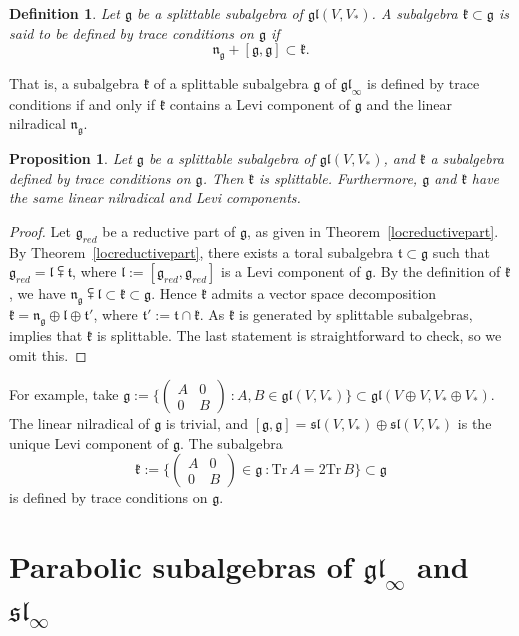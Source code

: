 \documentclass{article}
\newcommand {\tr} {\mathrm{Tr}}
\def\gl{\mathfrak {gl}}
\def\g{\mathfrak {g}}
\def\l{\mathfrak {l}}
\def\n{\mathfrak {n}}
\def\sl{\mathfrak{sl}}
\def\t{\mathfrak{t}}
\def\k{\mathfrak{k}}
\newtheorem{prop}[thm]{Proposition}
\newtheorem{defn}[thm]{Definition}
\begin{document}
\begin{defn} \label{traceconditions}
Let $\g$ be a splittable subalgebra of  $\gl(V,V_*)$.  A subalgebra $\k \subset \g$ is said to be \emph{defined by trace conditions} on $\g$ if $$\n_\g + [\g,\g] \subset \k.$$
\end{defn}


That is, a subalgebra $\k$ of a splittable subalgebra $\g$ of $\gl_\infty$ is defined by trace conditions if and only if $\k$ contains a Levi component of $\g$ and the linear nilradical $\n_\g$.  


\begin{prop} \label{toraltrace}
Let $\g$ be a splittable subalgebra of  $\gl(V,V_*)$, and $\k$ a subalgebra defined by trace conditions on $\g$.  Then $\k$ is splittable.  Furthermore, $\g$ and $\k$ have the same linear nilradical and Levi components.
\end{prop}

\begin{proof}
Let $\g_{red}$ be a reductive part of $\g$, as given in Theorem~\ref{locreductivepart}.   By Theorem~\ref{locreductivepart}, there exists a toral subalgebra $\t \subset \g$ such that $\g_{red} = \l \subsetplus \t$, where $\l := [\g_{red},\g_{red}]$ is a Levi component of $\g$.  By the definition of $\k$, we have $\n_\g \subsetplus \l \subset \k \subset \g$.  Hence $\k$ admits a vector space decomposition $\k = \n_\g \oplus \l \oplus \t'$, where $\t' := \t \cap \k$.  As $\k$ is generated by splittable subalgebras, \cite[Ch 7 \S 5 Cor 1]{Bourbaki} implies that $\k$ is splittable.
The last statement is straightforward to check, so we omit this.
\end{proof}


For example, take $\g :=  \Big\{ \left( \begin{array}{cc} A & 0 \\ 0 & B \end{array} \right) ~\colon  A, B \in \gl(V,V_*)  \Big\} \subset \gl(V \oplus V, V_* \oplus V_*)$. The linear nilradical of $\g$ is trivial, and $[\g,\g] = \sl(V,V_*) \oplus \sl(V,V_*)$ is the unique Levi component of $\g$.  The subalgebra $$\k := \Big\{ \left( \begin{array}{cc} A & 0 \\ 0 & B \end{array} \right) \in \g ~\colon \tr \, A = 2 \tr \,B \Big\} \subset \g$$ is defined by trace conditions on $\g$. 


\section{Parabolic subalgebras of $\gl_\infty$ and $\sl_\infty$} \label{glparabolic}
\end{document}
